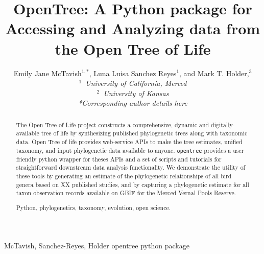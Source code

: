 \documentclass[oupdraft]{sysbio_sse}
\begin{document}
\title{OpenTree: A Python package for Accessing and Analyzing data from the Open Tree of Life}

\author{Emily Jane McTavish$^{1,\ast}$, Luna Luisa Sanchez Reyes$^{1}$, and
Mark T. Holder,$^{3}$\\[4pt]
\textit{$^{1}$~University of California, Merced}
\\
\textit{$^{2}$~University of Kansas}
\\[2pt]
\textit{*Corresponding author details here}}

\markboth%
{McTavish, Sanchez-Reyes, Holder}
{opentree python package}

\maketitle

\begin{abstract}
{The Open Tree of Life project constructs a comprehensive, dynamic and digitally-available tree of life by synthesizing published phylogenetic trees along with taxonomic data.
Open Tree of life provides web-service APIs to make the tree estimates, unified taxonomy, and input phylogenetic data available to anyone.
\texttt{opentree} provides a user friendly python wrapper for theses APIs and a set of scripts and tutorials for straightforward downstream data analysis functionality. 
We demonstrate the utility of these tools by generating an estimate of the phylogenetic relationships of all bird genera based on XX published studies, and by capturing a phylogenetic estimate for all taxon observation records available on GBIF for the Merced Vernal Pools Reserve.
}

{Python, phylogenetics, taxonomy, evolution, open science.}
\end{abstract}
\newline
\end{document}
